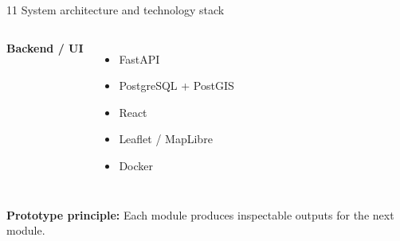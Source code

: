 \documentclass[aspectratio=169,11pt]{beamer}
\begin{document}
\begin{frame}[t]{11 \quad System architecture and technology stack}
\begin{columns}[T,totalwidth=\textwidth]

\textbf{\color{orange}Backend / UI}

\begin{itemize}
\item FastAPI
\item PostgreSQL + PostGIS
\item React
\item Leaflet / MapLibre
\item Docker
\end{itemize}

\end{columns}

\vspace{0.15cm}

\textbf{Prototype principle:}
Each module produces inspectable outputs for the next module.

\end{frame}
\end{document}
